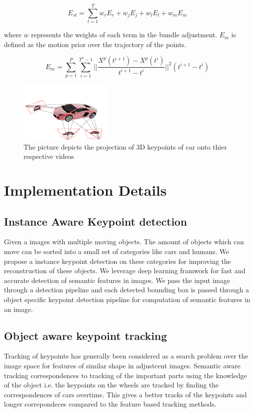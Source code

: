 \documentclass[10pt,twocolumn,letterpaper]{article}
\begin{document}
\begin{equation}
 E_{st} = \sum_{t=1}^T w_r E_r + w_j E_j + w_l E_l + w_m E_m 
\end{equation}

where $w$ represents the weights of each term in the bundle adjustment. $E_m$ is defined as the motion prior over the trajectory of the points.

\begin{equation}
E_m = \sum_{p =1 }^P \sum_{i = 1}^{T^n -1} ||\frac{X^p(t^{i+1}) - X^p(t^{i})}{t^{i+1} - t^{i}}||^2 (t^{i+1} - t^{i})
\end{equation}
\begin{figure}
  \centering
    \includegraphics[width=0.4\textwidth]{images/corr}
  \caption{The picture depicts the projection of 3D keypoints of car onto thier respective videos}
  \label{fig:corr}
\end{figure}

\section{Implementation Details}

\subsection{Instance Aware Keypoint detection}
Given a images with multiple moving objects. The amount of objects which can move can be sorted into a small set of categories like cars and humans. We propose a instance keypoint detection on these categories for improving the reconstruction of these objects. We leverage deep learning framwork for fast and accurate detection of semantic features in images. We pass the input image through a detection pipeline and each detected bounding box is passed through a object specific keypoint detection pipeline for computation of semantic features in an image.  

\subsection{Object aware keypoint tracking}
Tracking of keypoints has generally been considered as a search problem over the image space for features of similar shape in adjustcent images. Semantic aware tracking correspondences to tracking of the important parts using the knowledge of the object i.e. the keypoints on the wheels are tracked by finding the correspondences of cars overtime. This gives a better tracks of the keypoints and longer correpondeces compared to the feature based tracking methods. 
\end{document}
